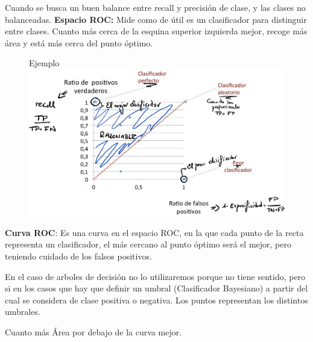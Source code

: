 \documentclass[12pt]{report} %
\begin{document}
Cuando se busca un buen balance entre recall y precisión de clase, y las
clases no balanceadas.
\newpage
\textbf{Espacio ROC:} Mide como de útil es un clasificador para
distinguir entre clases. Cuanto más cerca de la esquina superior
izquierda mejor, recoge más área y está más cerca del punto óptimo.
\begin{figure}[H]
	Ejemplo
	{\includegraphics[scale=.2]{Untitled 12.png}}
\end{figure}
\textbf{Curva ROC}: Es una curva en el espacio ROC, en la que cada punto
de la recta representa un clasificador, el más cercano al punto óptimo
será el mejor, pero teniendo cuidado de los falsos positivos.

En el caso de arboles de decisión no lo utilizaremos porque no tiene 
sentido, pero si en los casos que hay que definir un umbral 
(Clasificador Bayesiano) a partir del cual se considera de clase positiva 
o negativa. Los puntos representan los distintos umbrales.

Cuanto más Área por debajo de la curva mejor.
\end{document}
